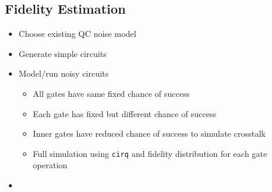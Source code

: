 \subsection{Fidelity Estimation}
\label{sec:vadaliFidelity}

\cite{vadali_quantum_2024}
\begin{itemize}
    \item Choose existing QC noise model
    \item Generate simple circuits
    \item Model/run noisy circuits
    \begin{itemize}
        \item All gates have same fixed chance of success
        \item Each gate has fixed but different chance of success
        \item Inner gates have reduced chance of success to simulate crosstalk
        \item Full simulation using \verb|cirq| and fidelity distribution for each gate operation
    \end{itemize}
    \item 
\end{itemize}
